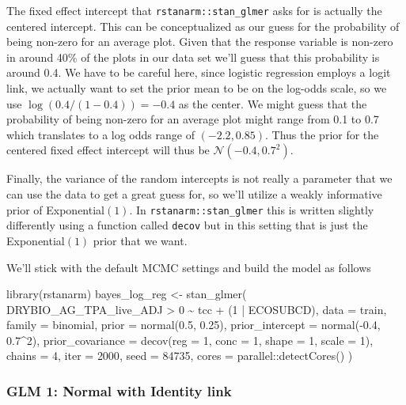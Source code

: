 \documentclass[12pt,twoside]{reedthesis}
\newenvironment{Shaded}{\begin{snugshade}}{\end{snugshade}}
\newcommand{\AttributeTok}[1]{\textcolor[rgb]{0.77,0.63,0.00}{#1}}
\newcommand{\DecValTok}[1]{\textcolor[rgb]{0.00,0.00,0.81}{#1}}
\newcommand{\FloatTok}[1]{\textcolor[rgb]{0.00,0.00,0.81}{#1}}
\newcommand{\FunctionTok}[1]{\textcolor[rgb]{0.00,0.00,0.00}{#1}}
\newcommand{\NormalTok}[1]{#1}
\newcommand{\OtherTok}[1]{\textcolor[rgb]{0.56,0.35,0.01}{#1}}
\newcommand{\SpecialCharTok}[1]{\textcolor[rgb]{0.00,0.00,0.00}{#1}}
\begin{document}
The fixed effect intercept that \texttt{rstanarm::stan\_glmer} asks for is actually the centered intercept. This can be conceptualized as our guess for the probability of being non-zero for an average plot. Given that the response variable is non-zero in around 40\% of the plots in our data set we'll guess that this probability is around 0.4. We have to be careful here, since logistic regression employs a logit link, we actually want to set the prior mean to be on the log-odds scale, so we use \(\log{(0.4/(1-0.4))} = -0.4\) as the center. We might guess that the probability of being non-zero for an average plot might range from 0.1 to 0.7 which translates to a log odds range of \((-2.2, 0.85)\). Thus the prior for the centered fixed effect intercept will thus be \(\mathcal{N}(-0.4, 0.7^2)\).

Finally, the variance of the random intercepts is not really a parameter that we can use the data to get a great guess for, so we'll utilize a weakly informative prior of Exponential\((1)\). In \texttt{rstanarm::stan\_glmer} this is written slightly differently using a function called \texttt{decov} but in this setting that is just the Exponential\((1)\) prior that we want.

We'll stick with the default MCMC settings and build the model as follows
\begin{Shaded}
\begin{Highlighting}[]
\FunctionTok{library}\NormalTok{(rstanarm)}
\NormalTok{bayes\_log\_reg }\OtherTok{\textless{}{-}} \FunctionTok{stan\_glmer}\NormalTok{(}
\NormalTok{  DRYBIO\_AG\_TPA\_live\_ADJ }\SpecialCharTok{\textgreater{}} \DecValTok{0} \SpecialCharTok{\textasciitilde{}}\NormalTok{ tcc }\SpecialCharTok{+}\NormalTok{ (}\DecValTok{1} \SpecialCharTok{|}\NormalTok{ ECOSUBCD),}
  \AttributeTok{data =}\NormalTok{ train,}
  \AttributeTok{family =}\NormalTok{ binomial,}
  \AttributeTok{prior =} \FunctionTok{normal}\NormalTok{(}\FloatTok{0.5}\NormalTok{, }\FloatTok{0.25}\NormalTok{),}
  \AttributeTok{prior\_intercept =} \FunctionTok{normal}\NormalTok{(}\SpecialCharTok{{-}}\FloatTok{0.4}\NormalTok{, }\FloatTok{0.7}\SpecialCharTok{\^{}}\DecValTok{2}\NormalTok{),}
  \AttributeTok{prior\_covariance =} \FunctionTok{decov}\NormalTok{(}\AttributeTok{reg =} \DecValTok{1}\NormalTok{, }\AttributeTok{conc =} \DecValTok{1}\NormalTok{, }\AttributeTok{shape =} \DecValTok{1}\NormalTok{, }\AttributeTok{scale =} \DecValTok{1}\NormalTok{),}
  \AttributeTok{chains =} \DecValTok{4}\NormalTok{, }\AttributeTok{iter =} \DecValTok{2000}\NormalTok{, }\AttributeTok{seed =} \DecValTok{84735}\NormalTok{,}
  \AttributeTok{cores =}\NormalTok{ parallel}\SpecialCharTok{::}\FunctionTok{detectCores}\NormalTok{()}
\NormalTok{)}
\end{Highlighting}
\end{Shaded}
\hypertarget{glm-1-normal-with-identity-link}{%
\subsubsection{GLM 1: Normal with Identity link}\label{glm-1-normal-with-identity-link}}
\end{document}

